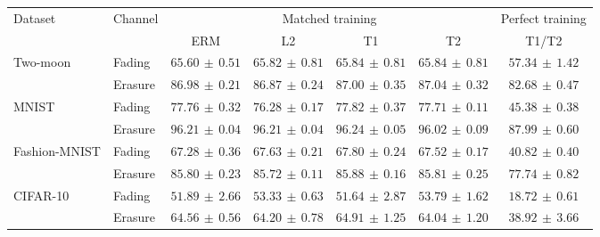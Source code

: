 \begin{tabular*}{\linewidth}{@{\extracolsep{\fill}}llccccc@{}}
\toprule
\multirow{2}{*}{Dataset} & \multirow{2}{*}{Channel} & \multicolumn{4}{c}{Matched training} & Perfect training \\
\cmidrule(lr){3-6}\cmidrule(l){7-7}
 & & ERM & L2 & T1 & T2 & T1/T2 \\
\midrule
\multirow{2}{*}{Two-moon} & Fading & $65.60\,\pm\,0.51$ & $65.82\,\pm\,0.81$ & $\mathbf{65.84}\,\pm\,0.81$ & $65.84\,\pm\,0.81$ & $57.34\,\pm\,1.42$ \\
 & Erasure & $86.98\,\pm\,0.21$ & $86.87\,\pm\,0.24$ & $87.00\,\pm\,0.35$ & $\mathbf{87.04}\,\pm\,0.32$ & $82.68\,\pm\,0.47$ \\
\midrule[0.25pt]
\multirow{2}{*}{MNIST} & Fading & $77.76\,\pm\,0.32$ & $76.28\,\pm\,0.17$ & $\mathbf{77.82}\,\pm\,0.37$ & $77.71\,\pm\,0.11$ & $45.38\,\pm\,0.38$ \\
 & Erasure & $96.21\,\pm\,0.04$ & $96.21\,\pm\,0.04$ & $\mathbf{96.24}\,\pm\,0.05$ & $96.02\,\pm\,0.09$ & $87.99\,\pm\,0.60$ \\
\midrule[0.25pt]
\multirow{2}{*}{Fashion-MNIST} & Fading & $67.28\,\pm\,0.36$ & $67.63\,\pm\,0.21$ & $\mathbf{67.80}\,\pm\,0.24$ & $67.52\,\pm\,0.17$ & $40.82\,\pm\,0.40$ \\
 & Erasure & $85.80\,\pm\,0.23$ & $85.72\,\pm\,0.11$ & $\mathbf{85.88}\,\pm\,0.16$ & $85.81\,\pm\,0.25$ & $77.74\,\pm\,0.82$ \\
\midrule[0.25pt]
\multirow{2}{*}{CIFAR-10} & Fading & $51.89\,\pm\,2.66$ & $53.33\,\pm\,0.63$ & $51.64\,\pm\,2.87$ & $\mathbf{53.79}\,\pm\,1.62$ & $18.72\,\pm\,0.61$ \\
 & Erasure & $64.56\,\pm\,0.56$ & $64.20\,\pm\,0.78$ & $\mathbf{64.91}\,\pm\,1.25$ & $64.04\,\pm\,1.20$ & $38.92\,\pm\,3.66$ \\
\bottomrule
\end{tabular*}
